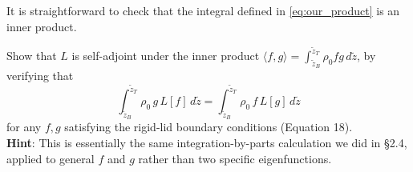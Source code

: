 It is straightforward to check that the integral defined in \eqref{eq:our_product} is an inner product. 



\begin{exercise}
Show that $L$ is self-adjoint under the inner product $\langle f, g\rangle = \int_{\tilde z_B}^{\tilde z_T} \rho_0 f g\, d\tilde z$, by verifying that
\begin{equation}
\int_{\tilde z_B}^{\tilde z_T} \rho_0\, g\, L[f]\, d\tilde z = \int_{\tilde z_B}^{\tilde z_T} \rho_0\, f\, L[g]\, d\tilde z
\end{equation}
for any $f, g$ satisfying the rigid-lid boundary conditions (Equation 18). 
\\ \textbf{Hint}: This is essentially the same integration-by-parts calculation we did in §2.4, applied to general $f$ and $g$ rather than two specific eigenfunctions.
\end{exercise}


